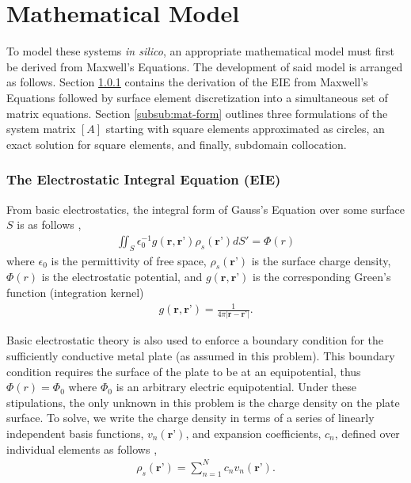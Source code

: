 \section{Mathematical Model}
\label{sec:mathmod}

To model these systems \textit{in silico}, an appropriate mathematical model must first be derived from Maxwell's Equations. The development of said model is arranged as follows. Section \ref{subsub:eie} contains the derivation of the EIE from Maxwell's Equations followed by surface element discretization into a simultaneous set of matrix equations. Section \ref{subsub:mat-form} outlines three formulations of the system matrix $[A]$ starting with square elements approximated as circles, an exact solution for square elements, and finally, subdomain collocation. 

\subsubsection{The Electrostatic Integral Equation (EIE)}
\label{subsub:eie}
From basic electrostatics, the integral form of Gauss's Equation over some surface $S$ is as follows \cite{rothlecnotes}, \cite{jin2011theory}
\begin{align}
    \iint_S\epsilon_0^{-1}g(\textbf{r},\textbf{r'})\rho_s(\textbf{r'})dS'=\Phi(r)
    \label{eq:Gauss}
\end{align}
where $\epsilon_0$ is the permittivity of free space, $\rho_s(\textbf{r'})$ is the surface charge density, $\Phi(r)$ is the electrostatic potential, and $g(\textbf{r},\textbf{r'})$ is the corresponding Green's function (integration kernel)
\begin{align}
    g(\textbf{r},\textbf{r'})=\frac{1}{4\pi|\textbf{r}-\textbf{r'}|}.
    \label{eq:greemn}
\end{align}

Basic electrostatic theory is also used to enforce a boundary condition for the sufficiently conductive metal plate (as assumed in this problem). This boundary condition requires the surface of the plate to be at an equipotential, thus $\Phi(r)=\Phi_0$ where $\Phi_0$ is an arbitrary electric equipotential. Under these stipulations, the only unknown in this problem is the charge density on the plate surface. To solve, we write the charge density in terms of a series of linearly independent basis functions, $v_n(\textbf{r'})$, and expansion coefficients, $c_n$, defined over individual elements as follows \cite{rothlecnotes}, \cite{jin2011theory}
\begin{align}
    \rho_s(\textbf{r'})=\sum_{n=1}^{N}c_nv_n(\textbf{r'}).
    \label{eq:rho_expansion}
\end{align}


